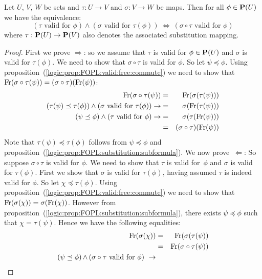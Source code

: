 \begin{prop}\label{logic:prop:FOPL:valid:composition}
    Let $U$, $V$, $W$ be sets and $\tau:U\to V$ and $\sigma:V\to W$ be
    maps. Then for all $\phi\in{\bf P}(U)$ we have the equivalence:
    \[
        (\mbox{$\tau$ valid for $\phi$})\land(\mbox{$\sigma$ valid for
        $\tau(\phi)$})\ 
            \Leftrightarrow\ 
        (\mbox{$\sigma\circ\tau$ valid for $\phi$})
    \]
    where $\tau:{\bf P}(U)\to{\bf P}(V)$ also denotes the associated
    substitution mapping.
\end{prop}
\begin{proof}
First we prove $\Rightarrow$: so we assume that $\tau$ is valid for
$\phi\in{\bf P}(U)$ and $\sigma$ is valid for $\tau(\phi)$. We need
to show that $\sigma\circ\tau$ is valid for $\phi$. So let
$\psi\preceq\phi$. Using
proposition~(\ref{logic:prop:FOPL:valid:free:commute}) we need to
show that $\mbox{\rm Fr}(\sigma\circ\tau(\psi))
=(\sigma\circ\tau)(\mbox{\rm Fr}(\psi))$:
    \begin{eqnarray*}
    \mbox{\rm Fr}(\sigma\circ\tau(\psi))&=&\mbox{\rm Fr}(\sigma(\tau(\psi)))\\
   (\tau(\psi)\preceq\tau(\phi))\land(\mbox{$\sigma$ valid for $\tau(\phi)$})\rightarrow
   &=&\sigma(\mbox{\rm Fr}(\tau(\psi)))\\
   (\psi\preceq\phi)\land(\mbox{$\tau$ valid for $\phi$})
   \rightarrow&=&\sigma(\tau(\mbox{\rm Fr}(\psi)))\\
   &=&(\sigma\circ\tau)(\mbox{\rm Fr}(\psi))
    \end{eqnarray*}
Note that $\tau(\psi)\preceq\tau(\phi)$ follows from
$\psi\preceq\phi$ and
proposition~(\ref{logic:prop:FOPL:substitution:subformula}). We now
prove~$\Leftarrow$: So suppose $\sigma\circ\tau$ is valid for
$\phi$. We need to show that $\tau$ is valid for~$\phi$ and $\sigma$
is valid for $\tau(\phi)$. First we show that $\sigma$ is valid for
$\tau(\phi)$, having assumed $\tau$ is indeed valid for $\phi$. So
let $\chi\preceq\tau(\phi)$. Using
proposition~(\ref{logic:prop:FOPL:valid:free:commute}) we need to
show that $\mbox{\rm Fr}(\sigma(\chi))=\sigma(\mbox{\rm Fr}(\chi))$. However from
proposition~(\ref{logic:prop:FOPL:substitution:subformula}), there
exists $\psi\preceq\phi$ such that $\chi=\tau(\psi)$. Hence we have
the following equalities:
    \begin{eqnarray*}
    \free(\sigma(\chi))&=&\free(\sigma(\tau(\psi))\\
    &=&\free(\sigma\circ\tau(\psi))\\
    \mbox{($\psi\preceq\phi$)$\,\land\,$($\sigma\circ\tau$ valid for $\phi$)}\ \rightarrow

\end{eqnarray*}
\end{proof}
